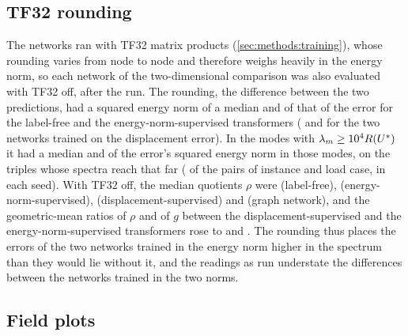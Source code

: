 \subsection{TF32 rounding}\label{app:repro:tf32}

The networks ran with TF32 matrix products (\cref{sec:methods:training}), whose rounding
varies from node to node and therefore weighs heavily in the energy norm, so each network of
the two-dimensional comparison was also evaluated with TF32 off, after the run. The
rounding, the difference between the two predictions, had a squared energy norm of a median
\numSpecTfFree{} and \numSpecTfKnorm{} of that of the error for the label-free and the
energy-norm-supervised transformers (\numSpecTfLab{} and \numSpecTfMgn{} for the two
networks trained on the displacement error). In the modes with $\lambda_m\ge10^4R(U^{\ast})$
it had a median \numSpecTfStiffFree{} and \numSpecTfStiffKnorm{} of the error's squared
energy norm in those modes, on the \numSpecTfStiffN{} triples whose spectra reach that far
(\numSpecTfStiffLoads{} of the \numSpecLoadCases{} pairs of instance and load case, in each
seed). With TF32 off, the median quotients $\rho$ were \numSpecIeeeRqFree{} (label-free),
\numSpecIeeeRqKnorm{} (energy-norm-supervised), \numSpecIeeeRqLab{}
(displacement-supervised) and \numSpecIeeeRqMgn{} (graph network), and the geometric-mean
ratios of $\rho$ and of $g$ between the displacement-supervised and the
energy-norm-supervised transformers rose to \numSpecIeeeLabKnormRq{} and
\numSpecIeeeLabKnormGap{}. The rounding thus places the errors of the two networks trained
in the energy norm higher in the spectrum than they would lie without it, and the readings
as run understate the differences between the networks trained in the two norms.

\subsection{Field plots}\label{app:repro:plots}

